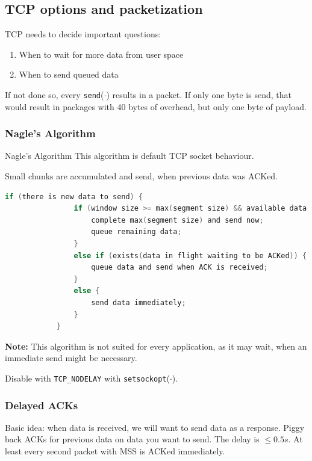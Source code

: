 \documentclass[english]{panikzettel}
\newcommand{\fkt}[1]{\texttt{#1}(\(\cdot\))}
\begin{document}
	\subsection{TCP options and packetization}
	\label{tcp-options-and-packetization}
	
	TCP needs to decide important questions: 
	\begin{enumerate}
		\item When to wait for more data from user space
		\item When to send queued data
	\end{enumerate}
	
	If not done so, every \fkt{send} results in a packet. If only one byte is send, that would result in packages with 40 bytes of overhead, but only one byte of payload.

	\subsubsection{Nagle's Algorithm}
	\label{nagles-algorithm}
	
	\begin{algo}{Nagle's Algorithm}
		This algorithm is default TCP socket behaviour.

		Small chunks are accumulated and send, when previous data was ACKed.
		\begin{lstlisting}[language=C]
			if (there is new data to send) {
				if (window size >= max(segment size) && available data >= max(segment size)) {
					complete max(segment size) and send now;
					queue remaining data;
				}
				else if (exists(data in flight waiting to be ACKed)) {
					queue data and send when ACK is received;
				}
				else {
					send data immediately;
				}
			}
		\end{lstlisting}
		\tcblower
		\textbf{Note:} This algorithm is not suited for every application, as it may wait, when an immediate send might be necessary.
	\end{algo}
	
	Disable with \texttt{TCP\_NODELAY} with \fkt{setsockopt}.

	\subsubsection{Delayed ACKs}
	\label{delayed-acks}

	Basic idea: when data is received, we will want to send data as a response.
	Piggy back ACKs for previous data on data you want to send.
	The delay is \( \leq 0.5 \textit{s} \).
	At least every second packet with MSS is ACKed immediately.
	
\end{document}

